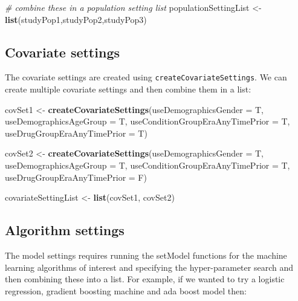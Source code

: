 \documentclass[]{article}
\newenvironment{Shaded}{\begin{snugshade}}{\end{snugshade}}
\newcommand{\KeywordTok}[1]{\textcolor[rgb]{0.13,0.29,0.53}{\textbf{#1}}}
\newcommand{\DataTypeTok}[1]{\textcolor[rgb]{0.13,0.29,0.53}{#1}}
\newcommand{\StringTok}[1]{\textcolor[rgb]{0.31,0.60,0.02}{#1}}
\newcommand{\CommentTok}[1]{\textcolor[rgb]{0.56,0.35,0.01}{\textit{#1}}}
\newcommand{\NormalTok}[1]{#1}
\begin{document}
\begin{Shaded}
\begin{Highlighting}[]
\CommentTok{# combine these in a population setting list}
\NormalTok{populationSettingList <-}\StringTok{ }\KeywordTok{list}\NormalTok{(studyPop1,studyPop2,studyPop3)}
\end{Highlighting}
\end{Shaded}

\subsection{Covariate settings}\label{covariate-settings}

The covariate settings are created using
\texttt{createCovariateSettings}. We can create multiple covariate
settings and then combine them in a list:

\begin{Shaded}
\begin{Highlighting}[]
\NormalTok{covSet1 <-}\StringTok{ }\KeywordTok{createCovariateSettings}\NormalTok{(}\DataTypeTok{useDemographicsGender =}\NormalTok{ T, }
                                   \DataTypeTok{useDemographicsAgeGroup =}\NormalTok{ T, }
                                   \DataTypeTok{useConditionGroupEraAnyTimePrior =}\NormalTok{ T,}
                                   \DataTypeTok{useDrugGroupEraAnyTimePrior =}\NormalTok{ T)}

\NormalTok{covSet2 <-}\StringTok{ }\KeywordTok{createCovariateSettings}\NormalTok{(}\DataTypeTok{useDemographicsGender =}\NormalTok{ T, }
                                   \DataTypeTok{useDemographicsAgeGroup =}\NormalTok{ T, }
                                   \DataTypeTok{useConditionGroupEraAnyTimePrior =}\NormalTok{ T,}
                                   \DataTypeTok{useDrugGroupEraAnyTimePrior =}\NormalTok{ F)}

\NormalTok{covariateSettingList <-}\StringTok{ }\KeywordTok{list}\NormalTok{(covSet1, covSet2)}
\end{Highlighting}
\end{Shaded}

\subsection{Algorithm settings}\label{algorithm-settings}

The model settings requires running the setModel functions for the
machine learning algorithms of interest and specifying the
hyper-parameter search and then combining these into a list. For
example, if we wanted to try a logistic regression, gradient boosting
machine and ada boost model then:
\end{document}
